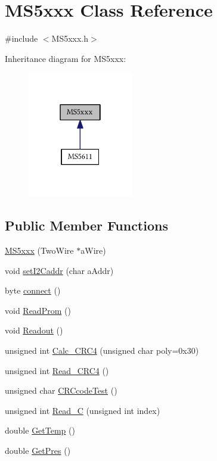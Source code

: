 \hypertarget{class_m_s5xxx}{}\section{M\+S5xxx Class Reference}
\label{class_m_s5xxx}


{\ttfamily \#include $<$M\+S5xxx.\+h$>$}



Inheritance diagram for M\+S5xxx\+:\nopagebreak
\begin{figure}[H]
\begin{center}
\leavevmode
\includegraphics[width=130pt]{class_m_s5xxx__inherit__graph}
\end{center}
\end{figure}
\subsection*{Public Member Functions}
\begin{DoxyCompactItemize}
\item 
\hyperlink{class_m_s5xxx_a6ed6b66a0c811a9a74f6cdfdfd77e5a9}{M\+S5xxx} (Two\+Wire $\ast$a\+Wire)
\item 
void \hyperlink{class_m_s5xxx_a6c3d564fe39d14dfa8804fa1600077d7}{set\+I2\+Caddr} (char a\+Addr)
\item 
byte \hyperlink{class_m_s5xxx_a0ac88722b71ab3d82a9d8888d92fe37d}{connect} ()
\item 
void \hyperlink{class_m_s5xxx_a654f0608616be8c4b13ec9850caaead0}{Read\+Prom} ()
\item 
void \hyperlink{class_m_s5xxx_abb83428fd002519dc52a666a70966eda}{Readout} ()
\item 
unsigned int \hyperlink{class_m_s5xxx_a2789efaa473b6bd09fa5d68d0cd0b838}{Calc\+\_\+\+C\+R\+C4} (unsigned char poly=0x30)
\item 
unsigned int \hyperlink{class_m_s5xxx_ab931e8cbdfb40384f07ca95139423853}{Read\+\_\+\+C\+R\+C4} ()
\item 
unsigned char \hyperlink{class_m_s5xxx_ab302490c7aeb6cf7ce0f7086f33481cf}{C\+R\+Ccode\+Test} ()
\item 
unsigned int \hyperlink{class_m_s5xxx_a94a8aaf538936a871b1753d76ebe0b62}{Read\+\_\+C} (unsigned int index)
\item 
double \hyperlink{class_m_s5xxx_ac19e5298f6d3f41c7d0edce1e369c36a}{Get\+Temp} ()
\item 
double \hyperlink{class_m_s5xxx_aa76127405d9f2ee85eddd92afdb57892}{Get\+Pres} ()
\end{DoxyCompactItemize}
